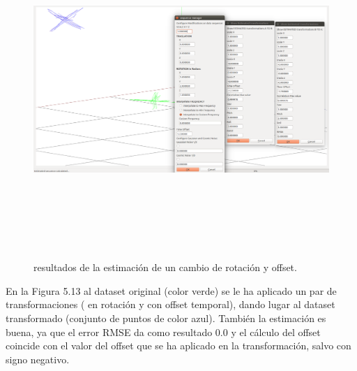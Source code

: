 \begin{figure}[h]
\begin{center}
\label{fig:opciones de View}\includegraphics[height=12.0cm,width=18.0cm]{img/cap6/Rota_Offset_abba.png}
\hspace{0.5cm}

\end{center}

\caption{ resultados de la estimación de un cambio de rotación y offset.}
\end{figure}

En la Figura 5.13 al dataset original (color verde) se le ha aplicado un par de transformaciones ( en rotación y con offset temporal), dando lugar al dataset transformado (conjunto de puntos de color azul). También la estimación es buena, ya que el error RMSE da como resultado 0.0 y el cálculo del offset coincide con el valor del offset que se ha aplicado en la transformación, salvo con signo negativo.


